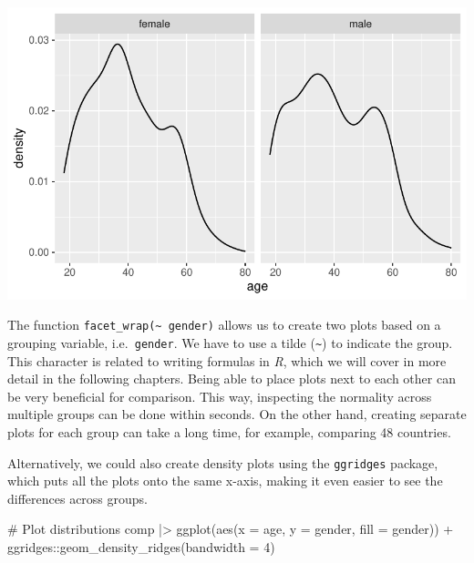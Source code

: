 \documentclass[
  letterpaper,
  DIV=11,
  numbers=noendperiod]{scrreprt}
\newenvironment{Shaded}{\begin{snugshade}}{\end{snugshade}}
\newcommand{\AttributeTok}[1]{\textcolor[rgb]{0.40,0.45,0.13}{#1}}
\newcommand{\CommentTok}[1]{\textcolor[rgb]{0.37,0.37,0.37}{#1}}
\newcommand{\DecValTok}[1]{\textcolor[rgb]{0.68,0.00,0.00}{#1}}
\newcommand{\FunctionTok}[1]{\textcolor[rgb]{0.28,0.35,0.67}{#1}}
\newcommand{\NormalTok}[1]{\textcolor[rgb]{0.00,0.23,0.31}{#1}}
\newcommand{\SpecialCharTok}[1]{\textcolor[rgb]{0.37,0.37,0.37}{#1}}
\begin{document}
\includegraphics{11_group_comparison_files/figure-pdf/comparability-of-egyptians-filter-1.pdf}

The function \texttt{facet\_wrap(\textasciitilde{}\ gender)} allows us
to create two plots based on a grouping variable, i.e.~\texttt{gender}.
We have to use a tilde (\texttt{\textasciitilde{}}) to indicate the
group. This character is related to writing formulas in \emph{R}, which
we will cover in more detail in the following chapters. Being able to
place plots next to each other can be very beneficial for comparison.
This way, inspecting the normality across multiple groups can be done
within seconds. On the other hand, creating separate plots for each
group can take a long time, for example, comparing 48 countries.

Alternatively, we could also create density plots using the
\texttt{ggridges} package, which puts all the plots onto the same
x-axis, making it even easier to see the differences across groups.

\begin{Shaded}
\begin{Highlighting}[]
\CommentTok{\# Plot distributions}
\NormalTok{comp }\SpecialCharTok{|\textgreater{}}
  \FunctionTok{ggplot}\NormalTok{(}\FunctionTok{aes}\NormalTok{(}\AttributeTok{x =}\NormalTok{ age,}
             \AttributeTok{y =}\NormalTok{ gender,}
             \AttributeTok{fill =}\NormalTok{ gender)) }\SpecialCharTok{+}
\NormalTok{  ggridges}\SpecialCharTok{::}\FunctionTok{geom\_density\_ridges}\NormalTok{(}\AttributeTok{bandwidth =} \DecValTok{4}\NormalTok{)}
\end{Highlighting}
\end{Shaded}
\end{document}
